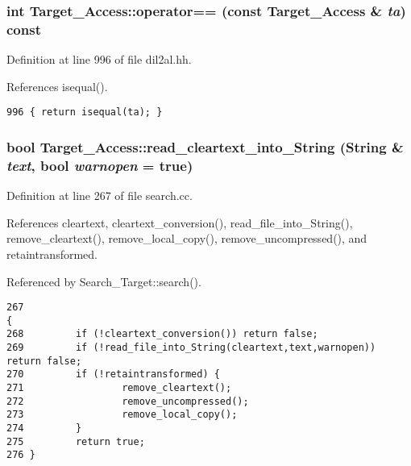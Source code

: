 \subsubsection{\setlength{\rightskip}{0pt plus 5cm}int Target\_\-Access::operator== (const Target\_\-Access \& {\em ta}) const\hspace{0.3cm}{\tt  [inline]}}\label{classTarget__Access_a4}




Definition at line 996 of file dil2al.hh.

References isequal().



\footnotesize\begin{verbatim}996 { return isequal(ta); }
\end{verbatim}\normalsize 
{}
\subsubsection{\setlength{\rightskip}{0pt plus 5cm}bool Target\_\-Access::read\_\-cleartext\_\-into\_\-String ({\bf String} \& {\em text}, bool {\em warnopen} = {\bf true})}\label{classTarget__Access_a11}




Definition at line 267 of file search.cc.

References cleartext, cleartext\_\-conversion(), read\_\-file\_\-into\_\-String(), remove\_\-cleartext(), remove\_\-local\_\-copy(), remove\_\-uncompressed(), and retaintransformed.

Referenced by Search\_\-Target::search().



\footnotesize\begin{verbatim}267                                                                                   {
268         if (!cleartext_conversion()) return false;
269         if (!read_file_into_String(cleartext,text,warnopen)) return false;
270         if (!retaintransformed) {
271                 remove_cleartext();
272                 remove_uncompressed();
273                 remove_local_copy();
274         }
275         return true;
276 }
\end{verbatim}\normalsize 
{}
